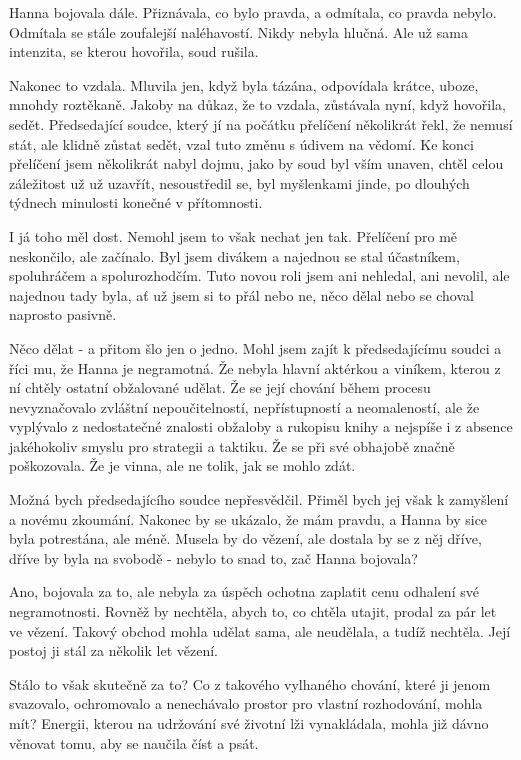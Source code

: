 \documentclass[13pt, a4paper, twoside]{article}
\begin{document}
\onehalfspacing \large

Hanna bojovala dále. Přiznávala, co bylo pravda, a odmítala, co pravda nebylo. Odmítala se stále zoufalejší naléhavostí. Nikdy nebyla hlučná. Ale už sama intenzita, se kterou hovořila, soud rušila.

Nakonec to vzdala. Mluvila jen, když byla tázána, odpovídala krátce, uboze, mnohdy roztěkaně. Jakoby na důkaz, že to vzdala, zůstávala nyní, když hovořila, sedět. Předsedající soudce, který jí na počátku přelíčení několikrát řekl, že nemusí stát, ale klidně zůstat sedět, vzal tuto změnu s údivem na vědomí. Ke konci přelíčení jsem několikrát nabyl dojmu, jako by soud byl vším unaven, chtěl celou záležitost už už uzavřít, nesoustředil se, byl myšlenkami jinde, po dlouhých týdnech minulosti konečné v přítomnosti.

I já toho měl dost. Nemohl jsem to však nechat jen tak. Přelíčení pro mě neskončilo, ale začínalo. Byl jsem divákem a najednou se stal účastníkem, spoluhráčem a spolurozhodčím. Tuto novou roli jsem ani nehledal, ani nevolil, ale najednou tady byla, ať už jsem si to přál nebo ne, něco dělal nebo se choval naprosto pasivně.

Něco dělat - a přitom šlo jen o jedno. Mohl jsem zajít k předsedajícímu soudci a říci mu, že Hanna je negramotná. Že nebyla hlavní aktérkou a viníkem, kterou z ní chtěly ostatní obžalované udělat. Že se její chování během procesu nevyznačovalo zvláštní nepoučitelností, nepřístupností a neomaleností, ale že vyplývalo z nedostatečné znalosti obžaloby a rukopisu knihy a nejspíše i z absence jakéhokoliv smyslu pro strategii a taktiku. Že se při své obhajobě značně poškozovala. Že je vinna, ale ne tolik, jak se mohlo zdát.

Možná bych předsedajícího soudce nepřesvědčil. Přiměl bych jej však k zamyšlení a novému zkoumání. Nakonec by se ukázalo, že mám pravdu, a Hanna by sice byla potrestána, ale méně. Musela by do vězení, ale dostala by se z něj dříve, dříve by byla na svobodě - nebylo to snad to, zač Hanna bojovala?

Ano, bojovala za to, ale nebyla za úspěch ochotna zaplatit cenu odhalení své negramotnosti. Rovněž by nechtěla, abych to, co chtěla utajit, prodal za pár let ve vězení. Takový obchod mohla udělat sama, ale neudělala, a tudíž nechtěla. Její postoj ji stál za několik let vězení.

Stálo to však skutečně za to? Co z takového vylhaného chování, které ji jenom svazovalo, ochromovalo a nenechávalo prostor pro vlastní rozhodování, mohla mít? Energii, kterou na udržování své životní lži vynakládala, mohla již dávno věnovat tomu, aby se naučila číst a psát.
\end{document}
